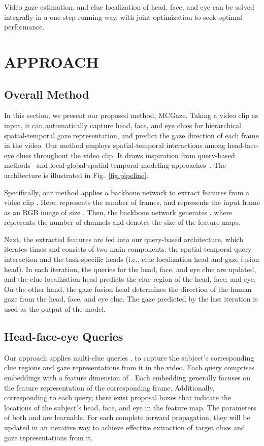 \documentclass[journal]{IEEEtran}
\begin{document}
 Video gaze estimation, and clue localization of head, face, and eye can be solved integrally in a one-step running way, with joint optimization to seek optimal performance.



\section{APPROACH}




\subsection{Overall Method}  
 In this section, we present our proposed method, MCGaze. Taking a video clip as input, it can automatically capture head, face, and eye clues for hierarchical spatial-temporal gaze representation, and predict the gaze direction of each frame in the video. 
Our method employs spatial-temporal interactions among head-face-eye clues throughout the video clip.  It draws inspiration from query-based methods~\cite{sparse,Tevit,instblink,garg2023multiscaled,spl_query_specific,2023query_video} and local-global spatial-temporal modeling approaches~\cite{local2023,local2020,liang2023local,cycmunet2023}.  
The architecture is illustrated in Fig.~\ref{fig:pipeline}.
 
Specifically, our method applies a backbone network to extract features from a video clip . Here,  represents the number of frames, and  represents the input frame as an RGB image of size . Then, the backbone network generates , where  represents the number of channels and  denotes the size of the feature maps.


Next, the extracted features are fed into our query-based architecture, which iterates  times and consists of two main components: the spatial-temporal query interaction and the task-specific heads (i.e., clue localization head and gaze fusion head). In each iteration, the queries for the head, face, and eye clue are updated, and the clue localization head predicts the clue region of the head, face, and eye. On the other hand, the gaze fusion head determines the direction of the human gaze from the head, face, and eye clue. The gaze predicted by the last iteration is used as the output of the model.

\subsection{Head-face-eye Queries}
Our approach applies multi-clue queries ,  to capture the subject's corresponding clue regions and gaze representations from it in the video. Each query comprises  embeddings with a feature dimension of . Each embedding generally focuses on the feature representation of the corresponding frame. Additionally, corresponding to each query, there exist proposal boxes  that indicate the locations of the subject's head, face, and eye in the feature map. The parameters of both  and  are learnable. For each complete forward propagation, they will be updated in an iterative way to achieve effective extraction of target clues and gaze representations from it.
 
\end{document}
